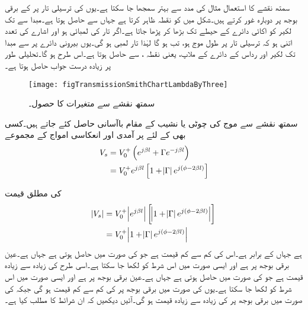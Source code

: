 سمتھ نقشے کا استعمال مثال کی مدد سے بہتر سمجھا جا سکتا ہے۔یوں  کی ترسیلی تار پر  کے برقی بوجھ پر دوبارہ غور کرتے ہیں۔شکل  میں  کو نقطہ  ظاہر کرتا ہے جہاں سے  حاصل ہوتا ہے۔مبدا سے  تک لکیر کو اکائی دائرے کے حیطے تک بڑھا کر  پڑھا جاتا ہے۔اگر تار کی لمبائی  ہو اور اشارے کی تعدد اتنی ہو  کہ ترسیلی تار پر طول موج  ہو، تب  ہو گا لہٰذا تار  لمبی ہو گی۔یوں  بیرونی دائرے پر  سے مبدا تک لکیر  اور  رداس کے دائرے کے ملاپ، یعنی نقطہ ، سے    حاصل ہوتا ہے۔اس طرح  ہو گا۔تحلیلی طور پر زیادہ درست جواب  حاصل ہوتا ہے۔

\begin{figure}
\centering
\texttt{[image: figTransmissionSmithChartLambdaByThree]}
\caption{سمتھ نقشے سے متغیرات کا حصول۔}
\label{شکل_ترسیلی_ایک_تہائی_تار}
\end{figure}

سمتھ نقشے سے موج کی چوٹی یا نشیب کے مقام باآسانی حاصل کئے جاتے ہیں۔کسی بھی  کے لئے  پر آمدی اور انعکاسی امواج کے مجموعے
\begin{align*}
V_s&=V_0^+ \left(e^{j\beta l} +\Gamma e^{-j \beta l}\right)\\
&=V_0^+ e^{j \beta l} \left[1+\abs{\Gamma} e^{j\left(\phi-2 \beta l\right)} \right]
\end{align*}

کی مطلق قیمت
\begin{align*}
\abs{V_s} &=V_0^+ \abs{e^{j\beta l}} \left[\abs{1+\abs{\Gamma} e^{j\left( \phi-2 \beta l\right)} }\right]\\
&=V_0^+\abs{1+\abs{\Gamma} e^{j\left(\phi-2 \beta l\right)} }
\end{align*}
ہے جہاں  کے برابر ہے۔اس کی کم سے کم قیمت  ہے جو  کی صورت میں حاصل ہوتی ہے جہاں  ہے۔عین برقی بوجھ پر  ہے اور ایسی صورت میں اس شرط کو  لکھا جا سکتا ہے۔اسی طرح  کی زیادہ سے زیادہ قیمت  ہے جو  کی صورت میں حاصل ہوتی ہے جہاں  ہے۔عین برقی بوجھ پر  ہے اور ایسی صورت میں اس شرط کو
  لکھا جا سکتا ہے۔یوں  کی صورت میں برقی بوجھ پر  کی کم سے کم قیمت ہو گی جبکہ  کی صورت میں برقی بوجھ پر  کی زیادہ سے زیادہ قیمت ہو گی۔آئیں دیکھیں کہ ان شرائط کا مطلب کیا ہے۔


